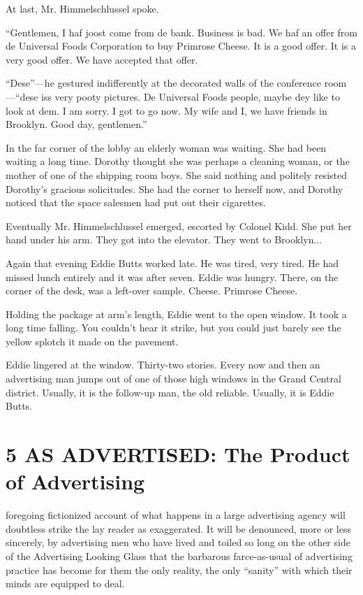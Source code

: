 \documentclass[twoside,nohyper,openany,nobib]{tufte-book}
\let\oldchapter\chapter
\def\chapter{%
  \setcounter{footnote}{0}%
  \oldchapter
}
\begin{document}
At last, Mr. Himmelschlussel spoke.

``Gentlemen, I haf joost come from de bank. Business is bad. We haf an
offer from de Universal Foods Corporation to buy Primrose Cheese. It is
a good offer. It is a very good offer. We have accepted that offer.

``Dese''---he gestured indifferently at the decorated walls of the
conference room---``dese iss very pooty pictures. De Universal Foods
people, maybe dey like to look at dem. I am sorry. I got to go now. My
wife and I, we have friends in Brooklyn. Good day, gentlemen.''

In the far corner of the lobby an elderly woman was waiting. She had
been waiting a long time. Dorothy thought she was perhaps a cleaning
woman, or the mother of one of the shipping room boys. She said nothing
and politely resisted Dorothy's gracious solicitudes. She had the corner
to herself now, and Dorothy noticed that the space salesmen had put out
their cigarettes.

Eventually Mr. Himmelschlussel emerged, escorted by Colonel Kidd. She
put her hand under his arm. They got into the elevator. They went to
Brooklyn...

Again that evening Eddie Butts worked late. He was tired, very tired. He
had missed lunch entirely and it was after seven. Eddie was hungry.
There, on the corner of the desk, was a left-over sample. Cheese.
Primrose Cheese.

Holding the package at arm's length, Eddie went to the open window. It
took a long time falling. You couldn't hear it strike, but you could
just barely see the yellow splotch it made on the pavement.

Eddie lingered at the window. Thirty-two stories. Every now and then an
advertising man jumps out of one of those high windows in the Grand
Central district. Usually, it is the follow-up man, the old reliable.
Usually, it is Eddie Butts.



\chapter[5 \hspace*{1mm} AS ADVERTISED: The Product of Advertising]{5 AS ADVERTISED: The Product of Advertising}

 foregoing fictionized account of what happens in a large advertising
agency will doubtless strike the lay reader as exaggerated. It will be
denounced, more or less sincerely, by advertising men who have lived and
toiled so long on the other side of the Advertising Looking Glass that
the barbarous farce-as-usual of advertising practice has become for them
the only reality, the only ``sanity'' with which their minds are
equipped to deal.
\end{document}
